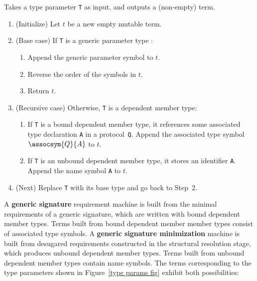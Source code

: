 \documentclass[../generics]{subfiles}
\begin{document}
\begin{algorithm}\label{build term generic}
Takes a type parameter \texttt{T} as input, and outputs a (non-empty) term.
\begin{enumerate}
\item (Initialize) Let $t$ be a new empty mutable term.
\item (Base case) If \texttt{T} is a generic parameter type :
\begin{enumerate}
\item Append the generic parameter symbol  to $t$.
\item Reverse the order of the symbols in $t$.
\item Return $t$.
\end{enumerate}
\item (Recursive case) Otherwise, \texttt{T} is a dependent member type:
\begin{enumerate}
\item If \texttt{T} is a bound dependent member type, it references some associated type declaration \texttt{A} in a protocol~\texttt{Q}. Append the associated type symbol $\assocsym{Q}{A}$ to $t$.
\item If \texttt{T} is an unbound dependent member type, it stores an identifier \texttt{A}. Append the name symbol \texttt{A} to $t$.
\end{enumerate}
\item (Next) Replace \texttt{T} with its base type and go back to Step~2.
\end{enumerate}
\end{algorithm}
%
A \textbf{generic signature} requirement machine is built from the minimal requirements of a generic signature, which are written with bound dependent member types. Terms built from bound dependent member member types consist of associated type symbols. A \textbf{generic signature minimization} machine is built from desugared requirements constructed in the structural resolution stage, which produces unbound dependent member types. Terms built from unbound dependent member types contain name symbols. The terms corresponding to the type parameters shown in Figure~\ref{type params fig} exhibit both possibilities:
\end{document}
